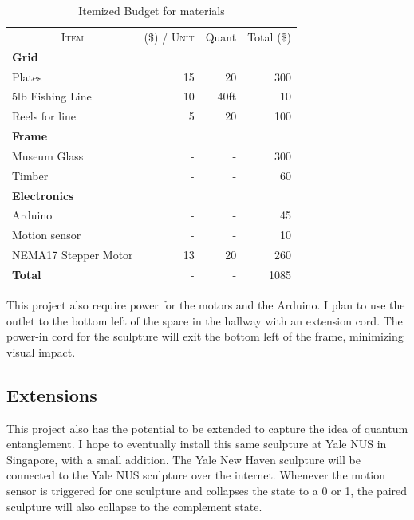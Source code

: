 \begin{table}[h!]
\centering
\caption{Itemized Budget for materials}
\label{table:results}
\vspace{0.4em}
\begin{tabular}{|l|r|r|r|}
\hline
\multicolumn{1}{|c|}{\multirow{2}{*}{\textsc{Item}}} 
  & \multicolumn{1}{c|}{\multirow{2}{*}{\scriptsize{(\$)} \textsc{/ Unit}}}
  & \multicolumn{1}{c|}{\multirow{2}{*}{\scriptsize{Quant}}}
  & \multicolumn{1}{c|}{\multirow{2}{*}{\scriptsize{Total} \scriptsize{(\$)}}} \\ 
& \multicolumn{1}{c|}{\textsc{}} & \multicolumn{1}{c|}{\textsc{}} & \\
\hline \hline
\textbf{Grid} & & & \\[-0.2em]
\quad Plates & 15 & 20 & 300  \\
\quad 5lb Fishing Line & 10 & 40ft & 10  \\
\quad Reels for line & 5 & 20 & 100  \\
\hline 
\textbf{Frame} & & & \\[-0.2em]
\quad Museum Glass & - & - & 300  \\
\quad Timber & - & - & 60  \\
\hline 
\textbf{Electronics} & & & \\[-0.2em]
\quad Arduino  & - & - & 45  \\
\quad Motion sensor & - & - & 10  \\ 
\quad NEMA17 Stepper Motor & 13 & 20 & 260  \\
\hline 
\hline 
\textbf{Total} & - & - & 1085 \\
\hline 
\end{tabular}
\end{table}

This project also require power for the motors and the Arduino. 
I plan to use the outlet to the bottom left of the space in the hallway with an extension cord.
The power-in cord for the sculpture will exit the bottom left of the frame, minimizing visual impact.

\subsection{Extensions}

This project also has the potential to be extended to capture the idea of quantum entanglement.
I hope to eventually install this same sculpture at Yale NUS in Singapore, with a small addition.
The Yale New Haven sculpture will be connected to the Yale NUS sculpture over the internet.
Whenever the motion sensor is triggered for one sculpture and collapses the state to a 0 or 1, the paired sculpture will also collapse to the complement state.


